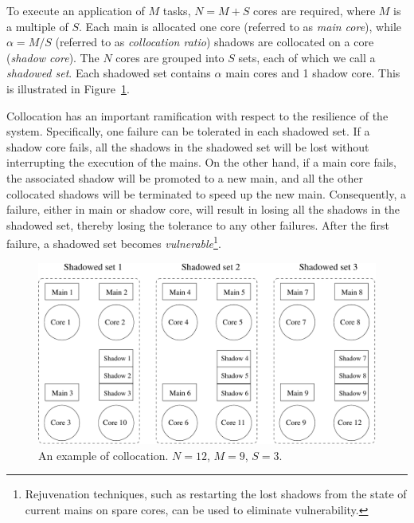 To execute an application of $M$ tasks, $N=M+S$ cores are required, where $M$ is a multiple of $S$. Each main is allocated one core (referred to as \textit{main core}), while $\alpha=M/S$ (referred to as \textit{collocation ratio}) shadows are collocated on a core (\textit{shadow core}). 
The $N$ cores are grouped into $S$ sets, each of which we call a \textit{shadowed set}. Each shadowed set contains $\alpha$ main cores and 1 shadow core.
This is illustrated in Figure~\ref{fig:sc_mapping}.  

Collocation has an important ramification with respect to the resilience of the system. Specifically, 
one failure can be tolerated in each shadowed set. If a shadow core fails, all the shadows in the 
shadowed set will be lost without interrupting the execution of the mains. 
On the other hand, if a main core fails, the associated shadow will be promoted to a new main, and all 
the other collocated shadows will be terminated to speed up the new main.
Consequently, a failure, either in main or shadow core, will result in losing all the shadows in the shadowed set, thereby losing the tolerance to any other failures. After the first failure, a shadowed set becomes \emph{vulnerable}\footnote{Rejuvenation techniques, such as restarting the lost shadows from the state of current mains on spare cores, can be used to eliminate vulnerability.}. 
 
\begin{figure}[!b]
  \begin{center}
    \includegraphics[width=0.6\columnwidth]{Figures/sc_mapping.pdf}
  \end{center}
  \caption{An example of collocation. $N=12$, $M=9$, $S=3$.}
  \label{fig:sc_mapping}
\end{figure}


